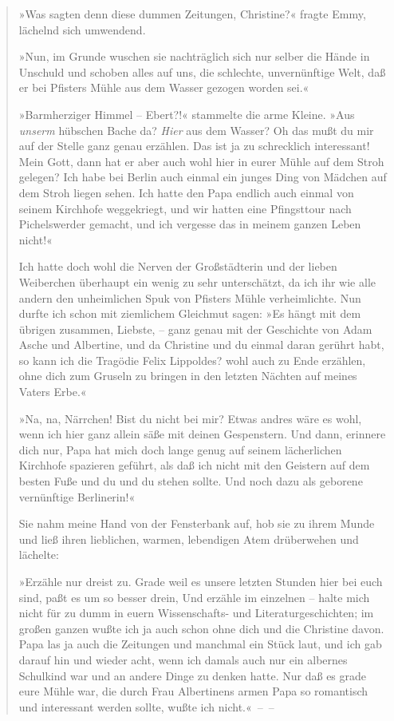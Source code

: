 \begin{verse}
»Was sagten denn diese dummen Zeitungen, Christine?« fragte Emmy,
lächelnd sich umwendend.

»Nun, im Grunde wuschen sie nachträglich sich nur selber die Hände
in Unschuld und schoben alles auf uns, die schlechte, unvernünftige
Welt, daß er bei Pfisters Mühle aus dem Wasser gezogen worden
sei.«

»Barmherziger Himmel – Ebert?!« stammelte die arme Kleine. »Aus
\emph{unserm} hübschen Bache da? \emph{Hier} aus dem Wasser? Oh das
mußt du mir auf der Stelle ganz genau erzählen. Das ist ja zu
schrecklich interessant! Mein Gott, dann hat er aber auch wohl hier
in eurer Mühle auf dem Stroh gelegen? Ich habe bei Berlin auch
einmal ein junges Ding von Mädchen auf dem Stroh liegen sehen. Ich
hatte den Papa endlich auch einmal von seinem Kirchhofe
weggekriegt, und wir hatten eine Pfingsttour nach Pichelswerder
gemacht, und ich vergesse das in meinem ganzen Leben nicht!«

Ich hatte doch wohl die Nerven der Großstädterin und der lieben
Weiberchen überhaupt ein wenig zu sehr unterschätzt, da ich ihr wie
alle andern den unheimlichen Spuk von Pfisters Mühle verheimlichte.
Nun durfte ich schon mit ziemlichem Gleichmut sagen: »Es hängt mit
dem übrigen zusammen, Liebste, – ganz genau mit der Geschichte von
Adam Asche und Albertine, und da Christine und du einmal daran
gerührt habt, so kann ich die Tragödie Felix Lippoldes? wohl auch
zu Ende erzählen, ohne dich zum Gruseln zu bringen in den letzten
Nächten auf meines Vaters Erbe.«

»Na, na, Närrchen! Bist du nicht bei mir? Etwas andres wäre es
wohl, wenn ich hier ganz allein säße mit deinen Gespenstern. Und
dann, erinnere dich nur, Papa hat mich doch lange genug auf seinem
lächerlichen Kirchhofe spazieren geführt, als daß ich nicht mit den
Geistern auf dem besten Fuße und du und du stehen sollte. Und noch
dazu als geborene vernünftige Berlinerin!«

Sie nahm meine Hand von der Fensterbank auf, hob sie zu ihrem Munde
und ließ ihren lieblichen, warmen, lebendigen Atem drüberwehen und
lächelte:

»Erzähle nur dreist zu. Grade weil es unsere letzten Stunden hier
bei euch sind, paßt es um so besser drein, Und erzähle im einzelnen
– halte mich nicht für zu dumm in euern Wissenschafts- und
Literaturgeschichten; im großen ganzen wußte ich ja auch schon ohne
dich und die Christine davon. Papa las ja auch die Zeitungen und
manchmal ein Stück laut, und ich gab darauf hin und wieder acht,
wenn ich damals auch nur ein albernes Schulkind war und an andere
Dinge zu denken hatte. Nur daß es grade eure Mühle war, die durch
Frau Albertinens armen Papa so romantisch und interessant werden
sollte, wußte ich nicht.«~–~–


\end{verse}
